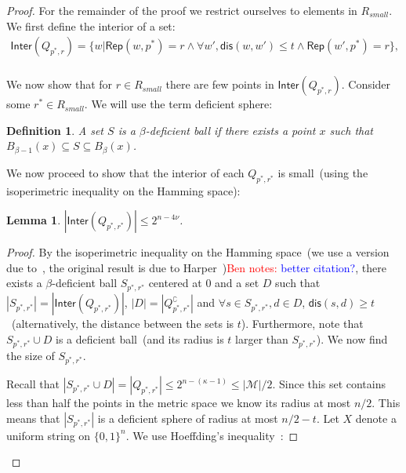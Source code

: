 \documentclass[11pt]{article}
\newcommand{\class}[1]{{\ensuremath{\mathsf{#1}}}}
\newcommand{\rep}{\ensuremath{\class{Rep}}\xspace}
\newcommand{\crust}{\ensuremath{\class{Crust}}\xspace}
\newcommand{\inter}{\ensuremath{\class{Inter}}\xspace}
\newcommand{\zo}{\ensuremath{\{0, 1\}}}
\newcommand{\dis}{\ensuremath{\mathsf{dis}}}
\newtheorem{lemma}[theorem]{Lemma}
\newtheorem{definition}[theorem]{Definition}
\newcommand{\authnote}[2]{{\textcolor{red}{\textsf{#1 notes: }\textcolor{blue}{ #2}}\marginpar{\textcolor{red}{\textbf{!!!!!}}}}}
\newcommand{\authnote}[2]{}
\newcommand{\bnote}[1]{{\authnote{Ben}{#1}}}
\begin{document}
\begin{proof}
For the remainder of the proof we restrict ourselves to elements in $R_{small}$.  We first define the interior of a set:%
\begin{align*}
\inter(Q_{p^*, r}) = \{w | \rep(w, p^*) = r \wedge \forall w', \dis(w, w') \le t \wedge \rep(w', p^*) =r\},\\
\end{align*}

We now show that for $r\in R_{small}$ there are few points in $\inter(Q_{p^*, r})$.  Consider some $r^*\in R_{small}$.  We will use the term deficient sphere:
\begin{definition}
A set $S$ is a $\beta$-deficient ball if there exists a point $x$ such that $B_{\beta-1}(x) \subseteq S \subseteq B_{\beta}(x)$.
\end{definition}

We now proceed to show that the interior of each $Q_{p^*, r^*}$ is small~(using the isoperimetric inequality on the Hamming space):

\begin{lemma}
$|\inter(Q_{p^*, r^*})| \le 2^{n-4\nu}$.
\end{lemma}
\begin{proof}
By the isoperimetric inequality on the Hamming space~(we use a version due to~\cite[Theorem 1]{frankl1981short}, the original result is due to Harper~\cite{harper1966optimal})\bnote{better citation?}, there exists a $\beta$-deficient ball $S_{p^*, r^*}$ centered at $0$ and a set $D$ such that $|S_{p^*, r^*}| = |\inter(Q_{p^*, r^*})|$, $|D| = |Q_{p^*, r^*}^\complement|$ and $\forall s\in S_{p^*, r^*}, d\in D$, $\dis(s, d) \ge t$~(alternatively, the distance between the sets is $t$).  Furthermore, note that $S_{p^*, r^*} \cup D$ is a deficient ball~(and its radius is $t$ larger than $S_{p^*, r^*}$).
We now find the size of $S_{p^*, r^*}$.

Recall that $|S_{p^*, r^*} \cup D| = |Q_{p^*, r^*} | \le 2^{n-(\kappa-1)}\leq |\mathcal{M}|/2$.  Since this set contains less than half the points in the metric space we know its radius at most $n/2$.  This means that $|S_{p^*, r^*}|$ is a deficient sphere of radius at most $n/2-t$.  Let $X$ denote a uniform string on $\zo^n$.  We use Hoeffding's inequality~\cite{hoeffding1963probability}:


\end{proof}
\end{proof}
\end{document}
